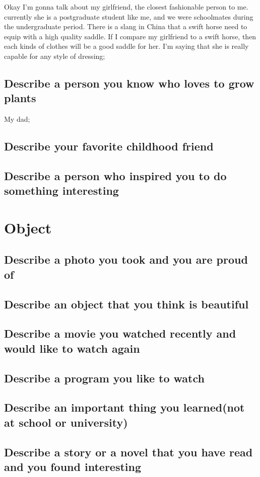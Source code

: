 \documentclass[conference]{IEEEtran}
\begin{document}
Okay I'm gonna talk about my girlfriend, the closest fashionable person to me.
currently she is a postgraduate student like me, and we were schoolmates during the undergraduate period.
There is a slang in China that a swift horse need to equip with a high quality saddle. If I compare
my girlfriend to a swift horse, then each kinds of clothes will be a good saddle for her.
I'm saying that she is really capable for any style of dressing;

\subsection{Describe a person you know who loves to grow plants}
My dad;
\subsection{Describe your favorite childhood friend}

\subsection{Describe a person who inspired you to do something interesting}


\section{Object}
\subsection{Describe a photo you took and you are proud of}
\subsection{Describe an object that you think is beautiful}
\subsection{Describe a movie you watched recently and would like to watch again}
\subsection{Describe a program you like to watch}
\subsection{Describe an important thing you learned(not at school or university)}
\subsection{Describe a story or a novel that you have read and you found interesting}
\end{document}
